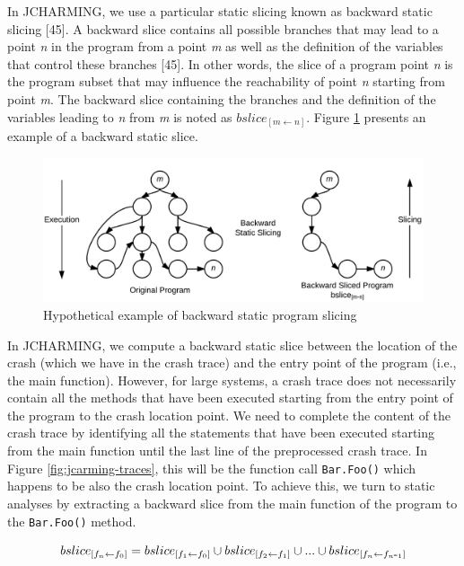 \documentclass[12pt]{report}
\def\mymathhyphen{{\hbox{-}}}
\begin{document}
In JCHARMING, we use a particular static slicing known as backward
static slicing {[}45{]}. A backward slice contains all possible branches
that may lead to a point \emph{n} in the program from a point \emph{m}
as well as the definition of the variables that control these branches
{[}45{]}. In other words, the slice of a program point \emph{n} is the
program subset that may influence the reachability of point \emph{n}
starting from point \emph{m}. The backward slice containing the branches
and the definition of the variables leading to \emph{n} from \emph{m} is
noted as \(bslice_{[m \leftarrow n]}\). Figure
\ref{fig:backward-slicing} presents an example of a backward static
slice.

\begin{figure}
  \centering
    \includegraphics[scale=.2]{media/chap8/backward-slicing.png}
    \caption{Hypothetical example of backward static program slicing\label{fig:backward-slicing}}
\end{figure}

In JCHARMING, we compute a backward static slice between the location of
the crash (which we have in the crash trace) and the entry point of the
program (i.e., the main function). However, for large systems, a crash
trace does not necessarily contain all the methods that have been
executed starting from the entry point of the program to the crash
location point. We need to complete the content of the crash trace by
identifying all the statements that have been executed starting from the
main function until the last line of the preprocessed crash trace. In
Figure \ref{fig:jcarming-traces}, this will be the function call
\lstinline!Bar.Foo()! which happens to be also the crash location point.
To achieve this, we turn to static analyses by extracting a backward
slice from the main function of the program to the \lstinline!Bar.Foo()!
method.

\begin{equation}
bslice_{[f_n \leftarrow f_0]} = bslice_{[f_1 \leftarrow f_0]} \cup bslice_{[f_2 \leftarrow f_1]} \cup ... \cup bslice_{[f_n \leftarrow f_{n\mymathhyphen1}]}
\end{equation}
\end{document}
